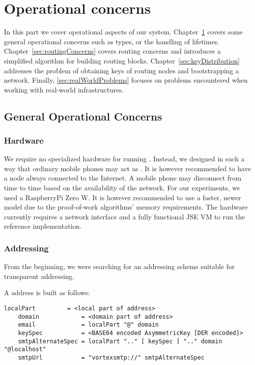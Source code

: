 \part{Operational concerns}\label{sec:operation}
In this part we cover operational aspects of our system. Chapter~\ref{sec:genOperationalConcerns} covers some general operational concerns such as \VortexNode{} types, or the handling of lifetimes. Chapter~\ref{sec:routingConcerns} covers routing concerns and introduces a simplified algorithm for building routing blocks. Chapter~\ref{sec:keyDistribution} addresses the problem of obtaining keys of routing nodes and bootstrapping a network. Finally, \cref{sec:realWorldProblems} focuses on problems encountered when working with real-world infrastructures.

\chapter{General Operational Concerns}\label{sec:genOperationalConcerns}
\section{Hardware}
We require no specialized hardware for running \VortexNodes. Instead, we designed \MessageVortex{} in such a way that ordinary mobile phones may act as \VortexNodes. It is however recommended to have a node always connected to the Internet. A mobile phone may disconnect from time to time based on the availability of the network. For our experiments, we used a RaspberryPi Zero W. It is however recommended to use a faster, newer model due to the proof-of-work algorithms' memory requirements. The hardware currently requires a network interface and a fully functional JSE VM to run the reference implementation.

\section{Addressing \VortexNodes}
From the beginning, we were searching for an addressing scheme suitable for transparent addressing.

A \MessageVortex{} address is built as follows: 

\begin{lstlisting}[language=EBNF]
	localPart         = <local part of address>
	domain            = <domain part of address>
	email             = localPart "@" domain
	keySpec           = <BASE64 encoded AsymmetricKey [DER encoded]>
	smtpAlternateSpec = localPart ".." [ keySpec ] ".." domain "@localhost"
	smtpUrl           = "vortexsmtp://" smtpAlternateSpec
\end{lstlisting}

